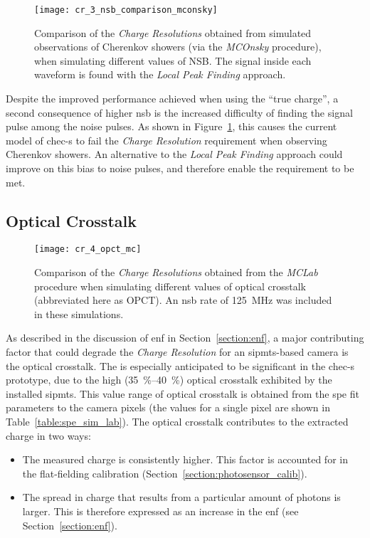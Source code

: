 \begin{figure}
	\centering
    \texttt{[image: cr\_3\_nsb\_comparison\_mconsky]} 
	\caption[Comparison of the \textit{Charge Resolution} at two different NSBs when observing Cherenkov showers (via the\textit{MCOnsky} procedure).]{Comparison of the \textit{Charge Resolutions} obtained from simulated observations of Cherenkov showers (via the \textit{MCOnsky} procedure), when simulating different values of NSB. The signal inside each waveform is found with the \textit{Local Peak Finding} approach.}
	\label{fig:cr_3_nsb_comparison_mconsky}
\end{figure}

Despite the improved performance achieved when using the ``true charge'', a second consequence of higher \gls{nsb} is the increased difficulty of finding the signal pulse among the noise pulses. As shown in Figure~\ref{fig:cr_3_nsb_comparison_mconsky}, this causes the current model of \gls{chec-s} to fail the \textit{Charge Resolution} requirement when observing Cherenkov showers. An alternative to the \textit{Local Peak Finding} approach could improve on this bias to noise pulses, and therefore enable the requirement to be met.

\subsection{Optical Crosstalk}

\begin{figure}[H]
	\centering
    \texttt{[image: cr\_4\_opct\_mc]} 
	\caption[Comparison of the \textit{Charge Resolution} at different values of optical crosstalk.]{Comparison of the \textit{Charge Resolutions} obtained from the \textit{MCLab} procedure when simulating different values of optical crosstalk (abbreviated here as OPCT). An \gls{nsb} rate of \SI{125}{MHz} was included in these simulations.}
	\label{fig:cr_4_opct_mc}
\end{figure}

As described in the discussion of \gls{enf} in Section~\ref{section:enf}, a major contributing factor that could degrade the \textit{Charge Resolution} for an  \glspl{sipmt}-based camera is the optical crosstalk. The is especially anticipated to be significant in the \gls{chec-s} prototype, due to the high (\SIrange{35}{40}{\percent}) optical crosstalk exhibited by the installed \glspl{sipmt}. This value range of optical crosstalk is obtained from the \gls{spe} fit parameters to the camera pixels (the values for a single pixel are shown in Table~\ref{table:spe_sim_lab}). The optical crosstalk contributes to the extracted charge in two ways: 
\begin{itemize}
\item The measured charge is consistently higher. This factor is accounted for in the flat-fielding calibration (Section~\ref{section:photosensor_calib}).
\item The spread in charge that results from a particular amount of photons is larger. This is therefore expressed as an increase in the \gls{enf} (see Section~\ref{section:enf}).
\end{itemize}

